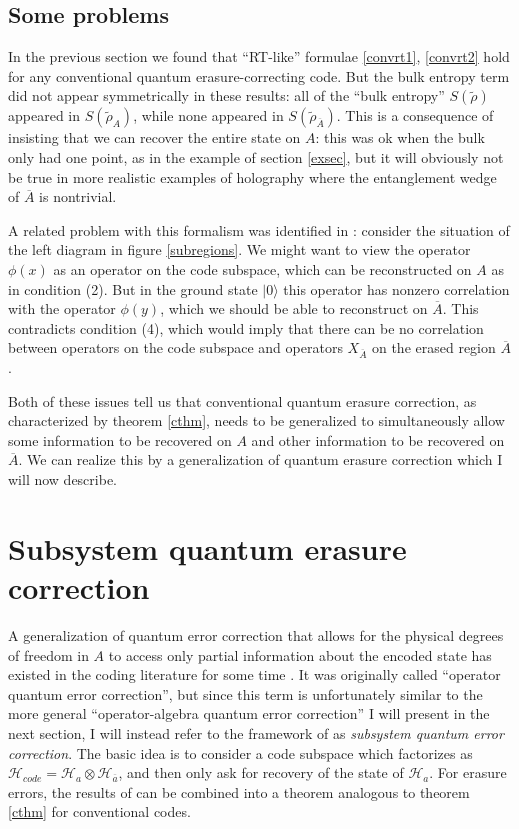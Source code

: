 \documentclass[12pt]{article}
\newcommand{\ran}{\rangle}
\newcommand{\wt}{\widetilde}
\newcommand{\Ab}{\ol{A}}
\newcommand{\Ha}{\mathcal{H}_{a}}
\newcommand{\Hab}{\mathcal{H}_{\ol{a}}}
\newcommand{\Hc}{\mathcal{H}_{code}}
\newcommand{\ol}{\overline}
\begin{document}
\subsection{Some problems}\label{probsec}
In the previous section we found that ``RT-like'' formulae \eqref{convrt1}, \eqref{convrt2} hold for any conventional quantum erasure-correcting code. But the bulk entropy term did not appear symmetrically in these results: all of the ``bulk entropy'' $S(\wt{\rho})$ appeared in $S(\wt{\rho}_A)$, while none appeared in $S(\wt{\rho}_{\Ab})$.  This is a consequence of insisting that we can recover the entire state on $A$: this was ok when the bulk only had one point, as in the example of section \ref{exsec}, but it will obviously not be true in more realistic examples of holography where the entanglement wedge of $\Ab$ is nontrivial. 

A related problem with this formalism was identified in \cite{Almheiri:2014lwa}: consider the situation of the left diagram in figure \ref{subregions}.  We might want to view the operator $\phi(x)$ as an operator on the code subspace, which can be reconstructed on $A$ as in condition (2). But in the ground state $|0\ran$ this operator has nonzero correlation with the operator $\phi(y)$, which we should be able to reconstruct on $\Ab$.  This contradicts condition (4), which would imply that there can be no correlation between operators on the code subspace and operators $X_{\Ab}$ on the erased region $\Ab$.  

Both of these issues tell us that conventional quantum erasure correction, as characterized by theorem \ref{cthm}, needs to be generalized to simultaneously allow some information to be recovered on $A$ and other information to be recovered on $\Ab$.  We can realize this by a generalization of quantum erasure correction which I will now describe.


\section{Subsystem quantum erasure correction}\label{subsec}
A generalization of quantum error correction that allows for the physical degrees of freedom in $A$ to access only partial information about the encoded state has existed in the coding literature for some time \cite{kribs2005unified,kribs2005operator,nielsen2007algebraic}.  It was originally called ``operator quantum error correction'', but since this term is unfortunately similar to the more general ``operator-algebra quantum error correction'' I will present in the next section, I will instead refer to the framework of \cite{kribs2005unified,kribs2005operator,nielsen2007algebraic} as \textit{subsystem quantum error correction}.  The basic idea is to consider a code subspace which factorizes as $\Hc=\Ha\otimes \Hab$, and then only ask for recovery of the state of $\Ha$.  For erasure errors, the results of \cite{kribs2005unified,kribs2005operator,nielsen2007algebraic} can be combined into a theorem analogous to theorem \ref{cthm} for conventional codes.     
\end{document}
